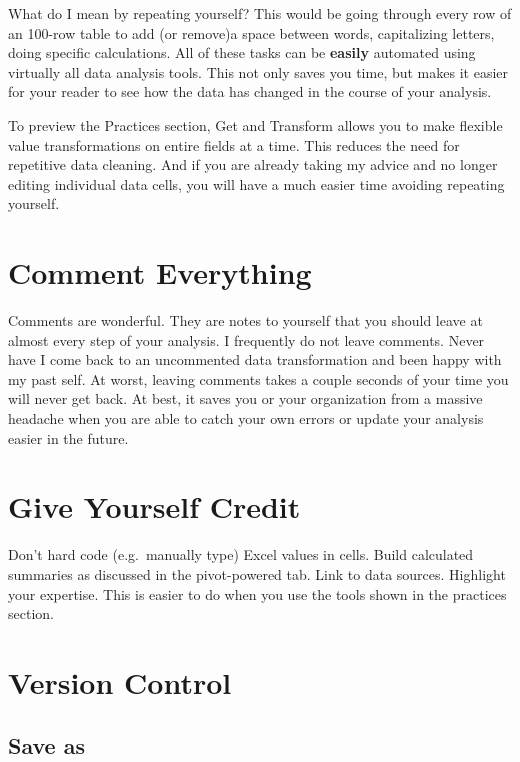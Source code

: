 \documentclass[]{book}
\begin{document}
What do I mean by repeating yourself? This would be going through every row of an 100-row table to add (or remove)a space between words, capitalizing letters, doing specific calculations. All of these tasks can be \textbf{easily} automated using virtually all data analysis tools. This not only saves you time, but makes it easier for your reader to see how the data has changed in the course of your analysis.

To preview the Practices section, Get and Transform allows you to make flexible value transformations on entire fields at a time. This reduces the need for repetitive data cleaning. And if you are already taking my advice and no longer editing individual data cells, you will have a much easier time avoiding repeating yourself.

\hypertarget{comment-everything}{%
\section{Comment Everything}\label{comment-everything}}

Comments are wonderful. They are notes to yourself that you should leave at almost every step of your analysis. I frequently do not leave comments. Never have I come back to an uncommented data transformation and been happy with my past self. At worst, leaving comments takes a couple seconds of your time you will never get back. At best, it saves you or your organization from a massive headache when you are able to catch your own errors or update your analysis easier in the future.

\hypertarget{give-yourself-credit}{%
\section{Give Yourself Credit}\label{give-yourself-credit}}

Don't hard code (e.g.~manually type) Excel values in cells. Build calculated summaries as discussed in the pivot-powered tab. Link to data sources. Highlight your expertise. This is easier to do when you use the tools shown in the practices section.

\hypertarget{version-control}{%
\section{Version Control}\label{version-control}}

\hypertarget{save-as}{%
\subsection{Save as}\label{save-as}}
\end{document}
